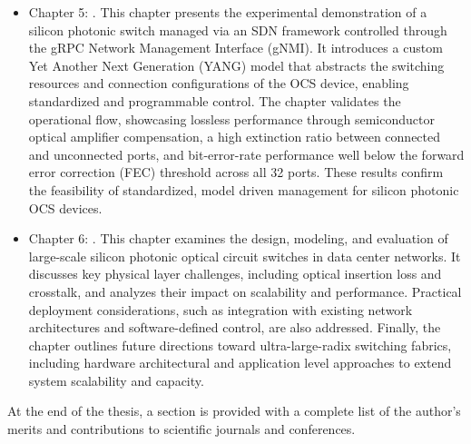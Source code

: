 \begin{itemize}
          Routing algorithms are applied to the corresponding switch graphs to evaluate blocking probability, while optical performance is assessed through insertion loss and signal-to-noise ratio.
          The resulting comparisons provide design guidelines for scalable silicon photonic optical circuit switches.
    \item Chapter 5: . This chapter presents the experimental demonstration of a silicon photonic switch managed via an SDN framework controlled through the gRPC Network Management Interface (gNMI).
          It introduces a custom Yet Another Next Generation (YANG) model that abstracts the switching resources and connection configurations of the OCS device, enabling standardized and programmable control.
          The chapter validates the operational flow, showcasing lossless performance through semiconductor optical amplifier compensation, a high extinction ratio between connected and unconnected ports,
          and bit-error-rate performance well below the forward error correction (FEC) threshold across all 32 ports.
          These results confirm the feasibility of standardized, model driven management for silicon photonic OCS devices.
    \item Chapter 6: . This chapter examines the design, modeling, and evaluation of large-scale silicon photonic optical circuit switches in data center networks.
          It discusses key physical layer challenges, including optical insertion loss and crosstalk, and analyzes their impact on scalability and performance.
          Practical deployment considerations, such as integration with existing network architectures and software-defined control, are also addressed.
          Finally, the chapter outlines future directions toward ultra-large-radix switching fabrics, including hardware architectural and application level approaches to extend system scalability and capacity.
\end{itemize}

At the end of the thesis, a section is provided with a complete list of the author's merits and contributions to scientific journals and conferences.
